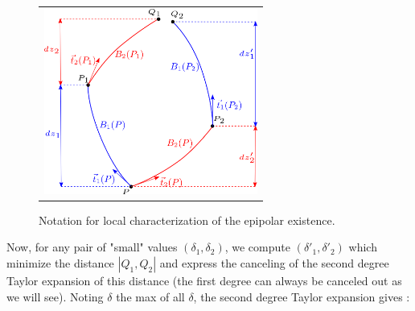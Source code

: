 \documentclass{ipol}
\newcommand{\mpd}[1]{\textcolor{magenta}{#1}}
\begin{document}




\begin{figure}
\centering
\begin{tabular}{c}
\includegraphics[width=7cm]{FIGS/EquadifEpip.png}
\end{tabular}
\caption{Notation for local characterization of the epipolar existence.}
\label{EqDifEpip}
\end{figure}

Now, for any pair of "small" values $(\delta_1,\delta_2)$,  we  compute 
$(\delta'_1,\delta'_2)$ which minimize the distance $|Q_1,Q_2|$ and express the canceling of the
second degree Taylor expansion of this distance (the first degree can always be canceled out as we will see).  Noting $\delta$ the max of all $\delta$, the second degree Taylor expansion gives :
\end{document}
